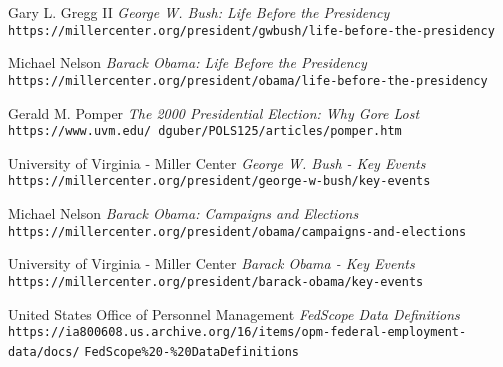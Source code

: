\documentclass{article}
\begin{document}
\newpage

\begin{thebibliography}{10}
    Gary L. Gregg II
    \textit{George W. Bush: Life Before the Presidency}
    \texttt{https://millercenter.org/president/gwbush/life-before-the-presidency}

    Michael Nelson
    \textit{Barack Obama: Life Before the Presidency}
    \texttt{https://millercenter.org/president/obama/life-before-the-presidency}

    Gerald M. Pomper
    \textit{The 2000 Presidential Election: Why Gore Lost}
    \texttt{https://www.uvm.edu/~dguber/POLS125/articles/pomper.htm}

    University of Virginia - Miller Center
    \textit{George W. Bush - Key Events}
    \texttt{https://millercenter.org/president/george-w-bush/key-events}

    Michael Nelson
    \textit{Barack Obama: Campaigns and Elections}
    \texttt{https://millercenter.org/president/obama/campaigns-and-elections}

    University of Virginia - Miller Center
    \textit{Barack Obama - Key Events}
    \texttt{https://millercenter.org/president/barack-obama/key-events}

    United States Office of Personnel Management
    \textit{FedScope Data Definitions}
    \texttt{https://ia800608.us.archive.org/16/items/opm-federal-employment-data/docs/}
    \texttt{FedScope\%20-\%20DataDefinitions}

\end{thebibliography}
\end{document}
